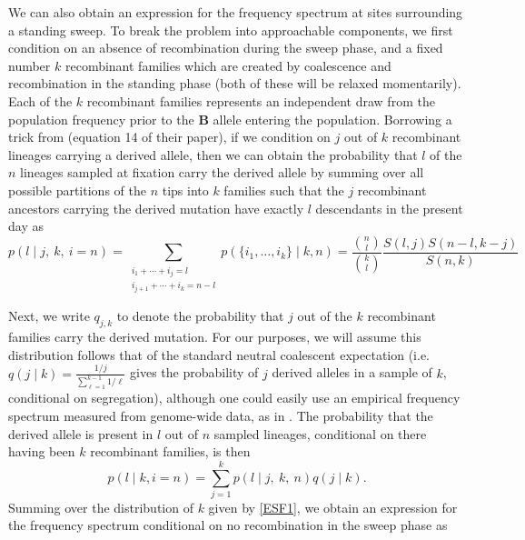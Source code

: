 \documentclass[a4paper,10pt]{article}
\begin{document}
We can also obtain an expression for the frequency spectrum at sites surrounding a standing sweep. To break the problem into approachable components, we first condition on an absence of recombination during the sweep phase, and a fixed number $k$ recombinant families which are created by coalescence and recombination in the standing phase (both of these will be relaxed momentarily). Each of the $k$ recombinant families represents an independent draw from the population frequency prior to the \textbf{B} allele entering the population. Borrowing a trick from \cite{Pennings:2006fs} (equation 14 of their paper), if we condition on $j$ out of $k$ recombinant lineages carrying a derived allele, then we can obtain the probability that $l$ of the $n$ lineages sampled at fixation carry the derived allele by summing over all possible partitions of the $n$ tips into $k$ families such that the $j$ recombinant ancestors carrying the derived mutation have exactly $l$ descendants in the present day as
\begin{equation}
p(l \mid j, ~k,~i=n) = \sum_{\substack{i_1+\cdots +i_j=l \\i_{j+1}+\cdots + i_k=n-l}} p(\{i_1,\dots,i_k\} \mid k, n) = \frac{ {n \choose l} }{ {k \choose l} }\frac{ S(l,j)  S(n-l,k-j)  }{ S(n,k) } \label{ESF_gives_freq_spec}
\end{equation}

Next, we write $q_{j,k}$ to denote the probability that $j$ out of the $k$ recombinant families carry the derived mutation. For our purposes, we will assume this distribution follows that of the standard neutral coalescent expectation (i.e. $q(j \mid k) = \frac{1/j}{\sum_{\ell=1}^{k-1}1/\ell}$ gives the probability of $j$ derived alleles in a sample of $k$, conditional on segregation), although one could easily use an empirical frequency spectrum measured from genome-wide data, as in \citep{NielsenKim}. The probability that the derived allele is present in $l$ out of $n$ sampled lineages, conditional on there having been $k$ recombinant families, is then 
\begin{equation}
	p(l \mid k, i = n ) = \sum_{j=1}^k p(l \mid j,~k, ~n)q(j\mid k).
\end{equation}	
Summing over the distribution of $k$ given by \eqref{ESF1}, we obtain an expression for the frequency spectrum conditional on no recombination in the sweep phase as
\end{document}
